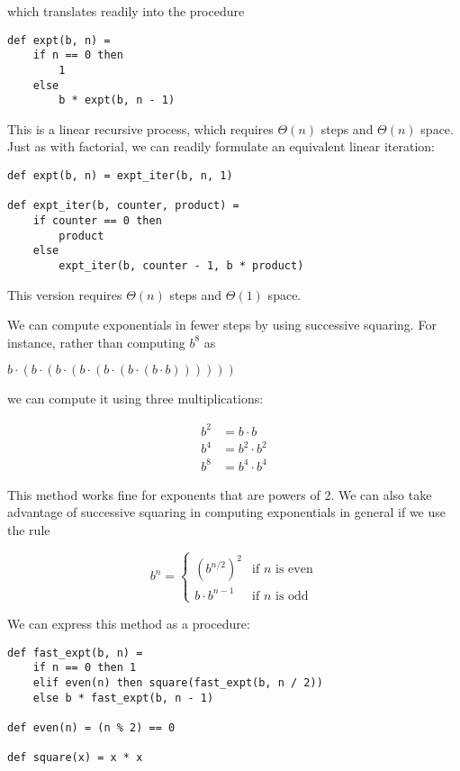 which translates readily into the procedure

\begin{lstlisting}
def expt(b, n) =
    if n == 0 then
        1
    else
        b * expt(b, n - 1)
\end{lstlisting}

This is a linear recursive process, which requires $\Theta(n)$ steps and $\Theta(n)$ space. Just as with factorial, we can readily formulate an equivalent linear iteration:

\begin{lstlisting}
def expt(b, n) = expt_iter(b, n, 1)

def expt_iter(b, counter, product) =
    if counter == 0 then
        product
    else
        expt_iter(b, counter - 1, b * product)
\end{lstlisting}

This version requires $\Theta(n)$ steps and $\Theta(1)$ space.

We can compute exponentials in fewer steps by using successive squaring. For instance, rather than computing $b^8$ as

$b \cdot (b \cdot (b \cdot (b \cdot (b \cdot (b \cdot (b \cdot b))))))$

we can compute it using three multiplications:

\begin{align}
b^2 &= b \cdot b \\
b^4 &= b^2 \cdot b^2 \\
b^8 &= b^4 \cdot b^4
\end{align}

This method works fine for exponents that are powers of 2. We can also take advantage of successive squaring in computing exponentials in general if we use the rule

\begin{equation}
b^n = \begin{cases}
(b^{n/2})^2 & \text{if } n \text{ is even} \\
b \cdot b^{n-1} & \text{if } n \text{ is odd}
\end{cases}
\end{equation}

We can express this method as a procedure:

\begin{lstlisting}
def fast_expt(b, n) =
    if n == 0 then 1
    elif even(n) then square(fast_expt(b, n / 2))
    else b * fast_expt(b, n - 1)

def even(n) = (n % 2) == 0

def square(x) = x * x
\end{lstlisting}

